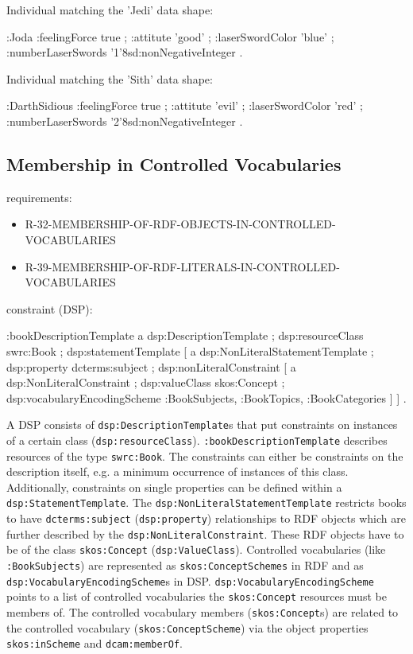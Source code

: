 \documentclass{llncs}
\newcommand{\ms}[1]{\texttt{#1}}
\begin{document}
Individual matching the 'Jedi' data shape:

\begin{ex}
:Joda 
    :feelingForce true ;
    :attitute 'good' ;
    :laserSwordColor 'blue' ;
    :numberLaserSwords '1'^^xsd:nonNegativeInteger .
\end{ex}

Individual matching the 'Sith' data shape:

\begin{ex}
:DarthSidious
    :feelingForce true ;
    :attitute 'evil' ;
    :laserSwordColor 'red' ;
    :numberLaserSwords '2'^^xsd:nonNegativeInteger . 
\end{ex}

\subsection{Membership in Controlled Vocabularies}

requirements:

\begin{itemize}
	\item R-32-MEMBERSHIP-OF-RDF-OBJECTS-IN-CONTROLLED-VOCABULARIES
	\item R-39-MEMBERSHIP-OF-RDF-LITERALS-IN-CONTROLLED-VOCABULARIES
\end{itemize}

constraint (DSP):

\begin{ex}
:bookDescriptionTemplate 
    a dsp:DescriptionTemplate ;
    dsp:resourceClass swrc:Book ; 
    dsp:statementTemplate [
        a dsp:NonLiteralStatementTemplate ;
        dsp:property dcterms:subject ; 
        dsp:nonLiteralConstraint [ 
            a dsp:NonLiteralConstraint ;
            dsp:valueClass skos:Concept ; 
            dsp:vocabularyEncodingScheme :BookSubjects, :BookTopics, :BookCategories ] ] .
\end{ex}

A DSP consists of \ms{dsp:DescriptionTemplate}s that put constraints on instances of a certain class (\ms{dsp:resourceClass}). 
\ms{:bookDescriptionTemplate} describes resources of the type \ms{swrc:Book}.
The constraints can either be constraints on the description itself, e.g. a minimum occurrence of instances of this class. Additionally, constraints on single properties can be defined within a \ms{dsp:StatementTemplate}.
The \ms{dsp:NonLiteralStatementTemplate} restricts books to have \ms{dcterms:subject} (\ms{dsp:property}) relationships to RDF objects which are further described by the \ms{dsp:NonLiteralConstraint}.
These RDF objects have to be of the class \ms{skos:Concept} (\ms{dsp:ValueClass}).
Controlled vocabularies (like \ms{:BookSubjects}) are represented as \ms{skos:ConceptSchemes} in RDF and as \ms{dsp:VocabularyEncodingScheme}s in DSP.
\ms{dsp:VocabularyEncodingScheme} points to a list of controlled vocabularies the \ms{skos:Concept} resources must be members of.
The controlled vocabulary members (\ms{skos:Concept}s) are related to the controlled vocabulary (\ms{skos:ConceptScheme}) via the object properties \ms{skos:inScheme} and \ms{dcam:memberOf}.
\end{document}
